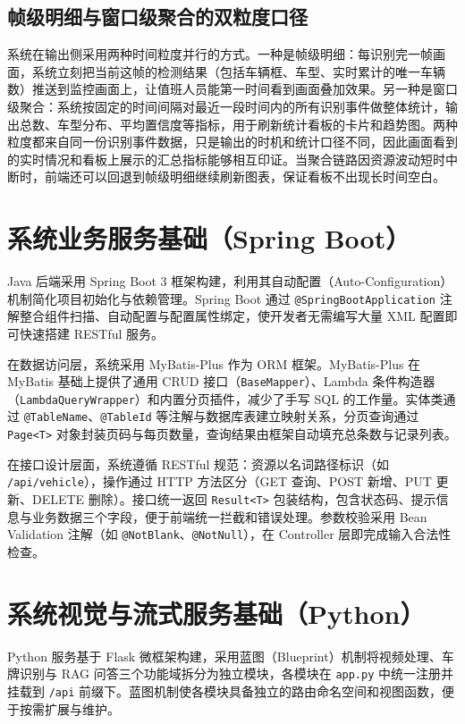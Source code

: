 \documentclass{wzuthesis} %
\begin{document}
\subsection{帧级明细与窗口级聚合的双粒度口径}

系统在输出侧采用两种时间粒度并行的方式。一种是帧级明细：每识别完一帧画面，系统立刻把当前这帧的检测结果（包括车辆框、车型、实时累计的唯一车辆数）推送到监控画面上，让值班人员能第一时间看到画面叠加效果。另一种是窗口级聚合：系统按固定的时间间隔对最近一段时间内的所有识别事件做整体统计，输出总数、车型分布、平均置信度等指标，用于刷新统计看板的卡片和趋势图。两种粒度都来自同一份识别事件数据，只是输出的时机和统计口径不同，因此画面看到的实时情况和看板上展示的汇总指标能够相互印证。当聚合链路因资源波动短时中断时，前端还可以回退到帧级明细继续刷新图表，保证看板不出现长时间空白。

\section{系统业务服务基础（Spring Boot）}

Java 后端采用 Spring Boot 3 框架构建，利用其自动配置（Auto-Configuration）机制简化项目初始化与依赖管理。Spring Boot 通过 \texttt{@SpringBootApplication} 注解整合组件扫描、自动配置与配置属性绑定，使开发者无需编写大量 XML 配置即可快速搭建 RESTful 服务。

在数据访问层，系统采用 MyBatis-Plus 作为 ORM 框架。MyBatis-Plus 在 MyBatis 基础上提供了通用 CRUD 接口（\texttt{BaseMapper}）、Lambda 条件构造器（\texttt{LambdaQueryWrapper}）和内置分页插件，减少了手写 SQL 的工作量。实体类通过 \texttt{@TableName}、\texttt{@TableId} 等注解与数据库表建立映射关系，分页查询通过 \texttt{Page<T>} 对象封装页码与每页数量，查询结果由框架自动填充总条数与记录列表。

在接口设计层面，系统遵循 RESTful 规范：资源以名词路径标识（如 \nolinkurl{/api/vehicle}），操作通过 HTTP 方法区分（GET 查询、POST 新增、PUT 更新、DELETE 删除）。接口统一返回 \texttt{Result<T>} 包装结构，包含状态码、提示信息与业务数据三个字段，便于前端统一拦截和错误处理。参数校验采用 Bean Validation 注解（如 \texttt{@NotBlank}、\texttt{@NotNull}），在 Controller 层即完成输入合法性检查。

\section{系统视觉与流式服务基础（Python）}

Python 服务基于 Flask 微框架构建，采用蓝图（Blueprint）机制将视频处理、车牌识别与 RAG 问答三个功能域拆分为独立模块，各模块在 \texttt{app.py} 中统一注册并挂载到 \texttt{/api} 前缀下。蓝图机制使各模块具备独立的路由命名空间和视图函数，便于按需扩展与维护。
\end{document}
